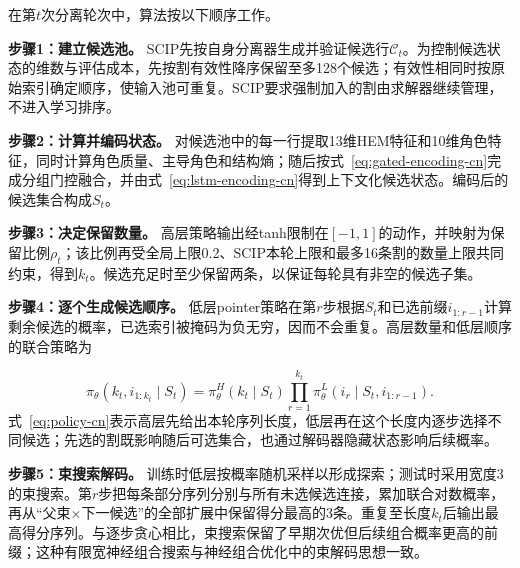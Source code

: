 \documentclass[final,5p,times,twocolumn]{elsarticle}
\begin{document}
在第$t$次分离轮次中，算法按以下顺序工作。

\noindent\textbf{步骤1：建立候选池。} SCIP先按自身分离器生成并验证候选行$\mathcal C_t$。为控制候选状态的维数与评估成本，先按割有效性降序保留至多128个候选；有效性相同时按原始索引确定顺序，使输入池可重复。SCIP要求强制加入的割由求解器继续管理，不进入学习排序。

\noindent\textbf{步骤2：计算并编码状态。} 对候选池中的每一行提取13维HEM特征和10维角色特征，同时计算角色质量、主导角色和结构熵；随后按式~\eqref{eq:gated-encoding-cn}完成分组门控融合，并由式~\eqref{eq:lstm-encoding-cn}得到上下文化候选状态。编码后的候选集合构成$S_t$。

\noindent\textbf{步骤3：决定保留数量。} 高层策略输出经tanh限制在$[-1,1]$的动作，并映射为保留比例$\rho_t$；该比例再受全局上限0.2、SCIP本轮上限和最多16条割的数量上限共同约束，得到$k_t$。候选充足时至少保留两条，以保证每轮具有非空的候选子集。

\noindent\textbf{步骤4：逐个生成候选顺序。} 低层pointer策略在第$r$步根据$S_t$和已选前缀$i_{1:r-1}$计算剩余候选的概率，已选索引被掩码为负无穷，因而不会重复。高层数量和低层顺序的联合策略为

\begin{equation}
\pi_\theta(k_t,i_{1:k_t}\mid S_t)=\pi_\theta^H(k_t\mid S_t)
\prod_{r=1}^{k_t}\pi_\theta^L(i_r\mid S_t,i_{1:r-1}).
\label{eq:policy-cn}
\end{equation}
式~\eqref{eq:policy-cn}表示高层先给出本轮序列长度，低层再在这个长度内逐步选择不同候选；先选的割既影响随后可选集合，也通过解码器隐藏状态影响后续概率。

\noindent\textbf{步骤5：束搜索解码。} 训练时低层按概率随机采样以形成探索；测试时采用宽度3的束搜索。第$r$步把每条部分序列分别与所有未选候选连接，累加联合对数概率，再从“父束$\times$下一候选”的全部扩展中保留得分最高的3条。重复至长度$k_t$后输出最高得分序列。与逐步贪心相比，束搜索保留了早期次优但后续组合概率更高的前缀；这种有限宽神经组合搜索与神经组合优化中的束解码思想一致\citep{choo2022beam}。
\end{document}
